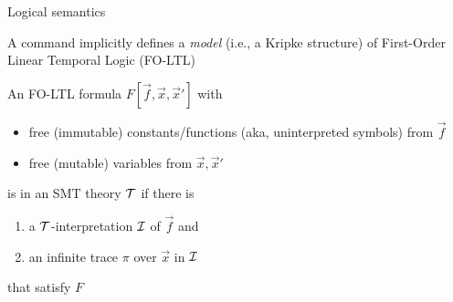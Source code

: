 \documentclass[10pt,aspectratio=149]{beamer}
\begin{document}
\begin{frame}{Logical semantics}

A  command implicitly defines 
a \alert{\emph{model}} (i.e., a Kripke structure) 
of \alert{First-Order} Linear Temporal Logic (FO-LTL)
\bigskip
\pause

An FO-LTL formula $F[\vec f, \vec x, \vec x']$ with 
\smallskip

\begin{itemize}
\item free (immutable) constants/functions (aka, uninterpreted symbols) from $\vec f$ 
\item free (mutable) variables from $\vec x, \vec x'$ 
\end{itemize}
\smallskip

is  in an SMT theory $\mathcal{T}$ if there is
\smallskip
\pause

\begin{enumerate}
\item a $\mathcal{T}$-interpretation $\mathcal{I}$ of $\vec f$ and 
\item an infinite trace $\pi$ over $\vec x$ in $\mathcal{I}$
\end{enumerate}
\smallskip

that \alert{satisfy} $F$

\end{frame}

\end{document}
